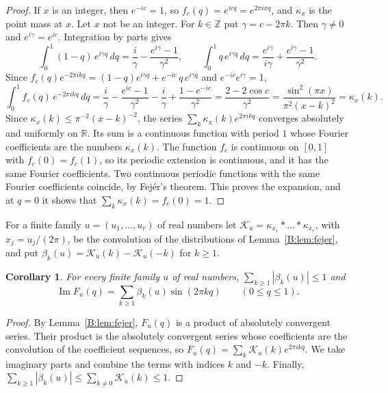 \documentclass[11pt]{amsart}
\newtheorem{corollary}[theorem]{Corollary}
\theoremstyle{remark}
\numberwithin{equation}{section}
\newcommand{\R}{\mathbb{R}}
\begin{document}
\begin{proof}
If $x$ is an integer, then $e^{-ic}=1$, so $f_c(q)=e^{icq}=e^{2\pi ixq}$, and $\kappa_x$ is the point mass at $x$. Let $x$ not be an integer. For $k\in\mathbb Z$ put $\gamma=c-2\pi k$. Then $\gamma\ne0$ and $e^{i\gamma}=e^{ic}$. Integration by parts gives
\[
\int_0^1(1-q)\,e^{i\gamma q}\,dq=\frac i\gamma-\frac{e^{i\gamma}-1}{\gamma^2},\qquad \int_0^1q\,e^{i\gamma q}\,dq=\frac{e^{i\gamma}}{i\gamma}+\frac{e^{i\gamma}-1}{\gamma^2}.
\]
Since $f_c(q)e^{-2\pi ikq}=(1-q)e^{i\gamma q}+e^{-ic}\,q\,e^{i\gamma q}$ and $e^{-ic}e^{i\gamma}=1$,
\[
\int_0^1f_c(q)\,e^{-2\pi ikq}\,dq=\frac i\gamma-\frac{e^{ic}-1}{\gamma^2}-\frac i\gamma+\frac{1-e^{-ic}}{\gamma^2}=\frac{2-2\cos c}{\gamma^2}=\frac{\sin^2(\pi x)}{\pi^2(x-k)^2}=\kappa_x(k).
\]
Since $\kappa_x(k)\le\pi^{-2}(x-k)^{-2}$, the series $\sum_k\kappa_x(k)e^{2\pi ikq}$ converges absolutely and uniformly on $\R$. Its sum is a continuous function with period $1$ whose Fourier coefficients are the numbers $\kappa_x(k)$. The function $f_c$ is continuous on $[0,1]$ with $f_c(0)=f_c(1)$, so its periodic extension is continuous, and it has the same Fourier coefficients. Two continuous periodic functions with the same Fourier coefficients coincide, by Fej\'er's theorem. This proves the expansion, and at $q=0$ it shows that $\sum_k\kappa_x(k)=f_c(0)=1$.
\end{proof}

For a finite family $u=(u_1,\dots,u_r)$ of real numbers let $\mathcal K_u=\kappa_{x_1}*\dots*\kappa_{x_r}$, with $x_j=u_j/(2\pi)$, be the convolution of the distributions of Lemma~\ref{B:lem:fejer}, and put $\beta_k(u)=\mathcal K_u(k)-\mathcal K_u(-k)$ for $k\ge1$.

\begin{corollary}\label{B:cor:skewseries}
For every finite family $u$ of real numbers, $\sum_{k\ge1}|\beta_k(u)|\le1$ and
\[
\operatorname{Im}F_u(q)=\sum_{k\ge1}\beta_k(u)\sin(2\pi kq)\qquad(0\le q\le1).
\]
\end{corollary}

\begin{proof}
By Lemma~\ref{B:lem:fejer}, $F_u(q)$ is a product of absolutely convergent series. Their product is the absolutely convergent series whose coefficients are the convolution of the coefficient sequences, so $F_u(q)=\sum_k\mathcal K_u(k)e^{2\pi ikq}$. We take imaginary parts and combine the terms with indices $k$ and $-k$. Finally, $\sum_{k\ge1}|\beta_k(u)|\le\sum_{k\ne0}\mathcal K_u(k)\le1$.
\end{proof}
\end{document}
